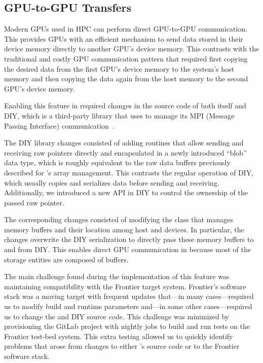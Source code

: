 \subsection{GPU-to-GPU Transfers}

Modern GPUs used in HPC can perform direct GPU-to-GPU communication. This provides GPUs with an efficient mechanism to send data stored in their device memory directly to another GPU's device memory. This contrasts with the traditional and costly GPU communication pattern that required first copying the desired data from the first GPU's device memory to the system's host memory and then copying the data again from the host memory to the second GPU's device memory.

Enabling this feature in \vtkm required changes in the source code of both \vtkm itself and DIY, which is a third-party library that \vtkm uses to manage its MPI (Message Passing Interface) communication~\citep{Peterka2011,Morozov2016}.

The DIY library changes consisted of adding routines that allow sending and receiving raw pointers directly and encapsulated in a newly introduced ``blob'' data type, which is roughly equivalent to the raw data buffers previously described for \vtkm's array management.
This contrasts the regular operation of DIY, which usually copies and serializes data before sending and receiving.
Additionally, we introduced a new API in DIY to control the ownership of the passed raw pointer.

The corresponding \vtkm changes consisted of modifying the \vtkm class that manages memory buffers and their location among host and devices.
In particular, the changes overwrite the DIY serialization to directly pass these memory buffers to and from DIY.
This enables direct GPU communication in \vtkm because most of the \vtkm storage entities are composed of \vtkm buffers. 

The main challenge found during the implementation of this feature was maintaining compatibility with the Frontier target system.
Frontier's software stack was a moving target with frequent updates that---in many cases---required us to modify build and runtime parameters and---in some other cases---required us to change the \vtkm and DIY source code.
This challenge was minimized by provisioning the \vtkm GitLab project with nightly jobs to build and run tests on the Frontier test-bed system.
This extra testing allowed us to quickly identify problems that arose from changes to either \vtkm's source code or to the Frontier software stack.
